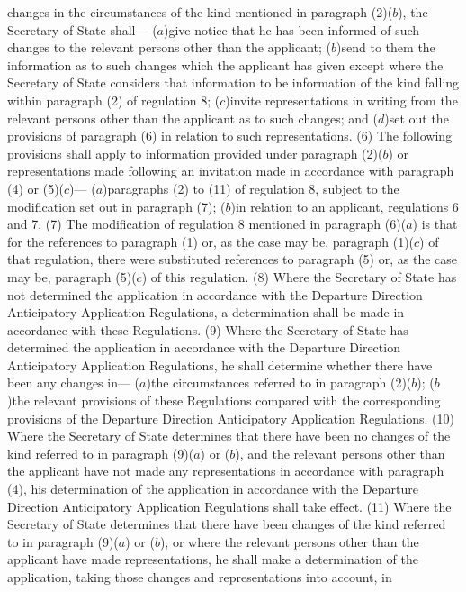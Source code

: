 \documentclass[a4paper]{article}
\begin{document}
changes in the circumstances of the kind mentioned in paragraph (2)($b$), the
Secretary of State shall—
($a$)give notice that he has been informed of such changes to the relevant persons
other than the applicant;
($b$)send to them the information as to such changes which the applicant has given
except where the Secretary of State considers that information to be information
of the kind falling within paragraph (2) of regulation 8;
($c$)invite representations in writing from the relevant persons other than the
applicant as to such changes; and
($d$)set out the provisions of paragraph (6) in relation to such representations.
(6) The following provisions shall apply to information provided under paragraph
(2)($b$) or representations made following an invitation made in accordance with
paragraph (4) or (5)($c$)—
($a$)paragraphs (2) to (11) of regulation 8, subject to the modification set out
in paragraph (7);
($b$)in relation to an applicant, regulations 6 and 7.
(7) The modification of regulation 8 mentioned in paragraph (6)($a$) is that for
the references to paragraph (1) or, as the case may be, paragraph (1)($c$) of that
regulation, there were substituted references to paragraph (5) or, as the case
may be, paragraph (5)($c$) of this regulation.
(8) Where the Secretary of State has not determined the application in
accordance with the Departure Direction Anticipatory Application Regulations, a
determination shall be made in accordance with these Regulations.
(9) Where the Secretary of State has determined the application in accordance
with the Departure Direction Anticipatory Application Regulations, he shall
determine whether there have been any changes in—
($a$)the circumstances referred to in paragraph (2)($b$);
($b$)the relevant provisions of these Regulations compared with the corresponding
provisions of the Departure Direction Anticipatory Application Regulations.
(10) Where the Secretary of State determines that there have been no changes of
the kind referred to in paragraph (9)($a$) or ($b$), and the relevant persons other
than the applicant have not made any representations in accordance with
paragraph (4), his determination of the application in accordance with the
Departure Direction Anticipatory Application Regulations shall take effect.
(11) Where the Secretary of State determines that there have been changes of the
kind referred to in paragraph (9)($a$) or ($b$), or where the relevant persons other
than the applicant have made representations, he shall make a determination of
the application, taking those changes and representations into account, in
\end{document}
